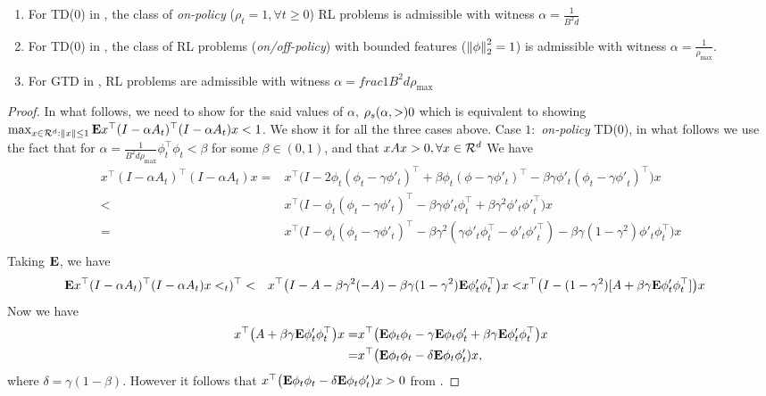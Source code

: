 \begin{theorem}
\begin{enumerate}[leftmargin=*]
\item For TD(0) in , the class of \emph{on-policy} ($\rho_t=1,\forall t\geq 0$) RL problems is admissible with witness $\alpha=\frac{1}{B^2 d}$
\item For TD(0) in , the class of RL problems (\emph{on/off-policy}) with bounded features ($\left\| \phi\right\|^2_2=1$) is admissible  with witness $\alpha=\frac{1}{\rho_{\max}}$.
\item For GTD in , RL problems are admissible with witness $\alpha=frac{1}{B^2d\rho_{\max}}$
\end{enumerate}
\end{theorem}
\begin{proof}
In what follows, we need to show for the said values of $\alpha$, $\rho_s(\alpha,>)0$ which is equivalent to showing $\max_{x\in \mathcal{R}^d: \left\| x\right\|\leq 1}\mathbf{E}{x^\top(I-\alpha A_t)^\top (I-\alpha A_t)x}<1$. We show it for all the three cases above.
Case $1:$ \emph{on-policy} TD(0), in what follows we use the fact that for $\alpha=\frac{1}{B^2d \rho_{\max}}\phi^\top_t\phi_t<\beta$ for some $\beta\in (0,1)$, and that $xAx>0,\forall x \in \mathcal{R}^{d}$ We have
\begin{align*}
x^\top(I-\alpha A_t)^\top (I-\alpha A_t)x=&x^\top\big( I- 2\phi_t(\phi_t-\gamma\phi'_t)^\top +\beta\phi_t(\phi-\gamma\phi'_t)^\top-\beta\gamma\phi'_t(\phi_t-\gamma{\phi'}_t)^\top \big)x\\
<&x^\top\big( I- \phi_t(\phi_t-\gamma\phi'_t)^\top -\beta\gamma\phi'_t\phi^\top_t+\beta\gamma^2\phi'_t{\phi'}_t^\top \big)x\\
=&x^\top\big( I- \phi_t(\phi_t-\gamma\phi'_t)^\top -\beta\gamma^2(\gamma\phi'_t\phi^\top_t- \phi'_t{\phi'}_t^\top)-\beta\gamma(1-\gamma^2)\phi'_t\phi_t^\top \big)x\\
\end{align*}
Taking $\mathbf{E}$, we have
\begin{align*}
\mathbf{E}{x^\top(I-\alpha A_t)^\top (I-\alpha A_t)x}<&_t)^\top <&x^\top\big( I- A -\beta\gamma^2(-A)-\beta\gamma(1-\gamma^2)\mathbf{E}{\phi'_t\phi_t^\top} \big)x
<&x^\top\big( I- (1-\gamma^2)[A +\beta\gamma\mathbf{E}{\phi'_t\phi_t^\top}] \big)x
\end{align*}
Now we have 
\begin{align*}
x^\top\big(A +\beta\gamma\mathbf{E}{\phi'_t\phi_t^\top}\big)x=& x^\top\big(\mathbf{E}{\phi_t\phi_t}-\gamma\mathbf{E}{\phi_t\phi'_t} +\beta\gamma\mathbf{E}{\phi'_t\phi_t^\top}\big)x\\
=&x^\top\big(\mathbf{E}{\phi_t\phi_t}-\delta\mathbf{E}{\phi_t\phi'_t} )x,
\end{align*}
where $\delta=\gamma(1-\beta)$. However it follows that $x^\top\big(\mathbf{E}{\phi_t\phi_t}-\delta\mathbf{E}{\phi_t\phi'_t} )x>0$ from .


\end{proof}
